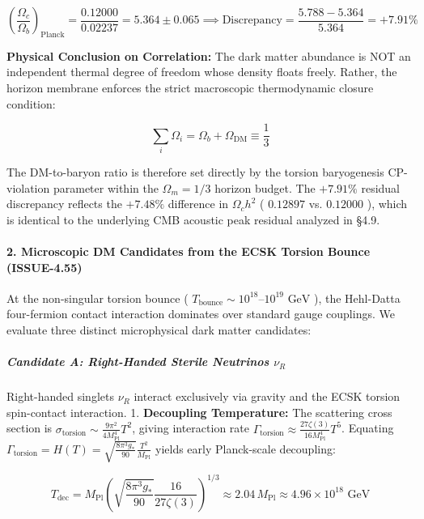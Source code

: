 \documentclass[11pt,a4paper]{article}
\theoremstyle{definition}\newtheorem{definition}{Definition}
\theoremstyle{remark}\newtheorem{remark}{Remark}
\begin{document}
\begin{equation}
\left(\frac{\Omega_c}{\Omega_b}\right)_{\text{Planck}} = \frac{0.12000}{0.02237} = 5.364 \pm 0.065 \implies \text{Discrepancy} = \frac{5.788 - 5.364}{5.364} = \mathbf{+7.91\%}
\end{equation}


\textbf{Physical Conclusion on Correlation:} The dark matter abundance is NOT an independent thermal degree of freedom whose density floats freely. Rather, the horizon membrane enforces the strict macroscopic thermodynamic closure condition:


\begin{equation}
\sum_i \Omega_i = \Omega_b + \Omega_{\text{DM}} \equiv \frac{1}{3}
\end{equation}


The DM-to-baryon ratio is therefore set directly by the torsion baryogenesis CP-violation parameter within the $\Omega_m = 1/3$ horizon budget. The $+7.91\%$ residual discrepancy reflects the $+7.48\%$ difference in $\Omega_c h^2$ ( $0.12897$ vs. $0.12000$ ), which is identical to the underlying CMB acoustic peak residual analyzed in §4.9.
\paragraph{2. Microscopic DM Candidates from the ECSK Torsion Bounce (ISSUE-4.55)}

At the non-singular torsion bounce ( $T_{\text{bounce}} \sim 10^{18}\text{--}10^{19}\text{ GeV}$ ), the Hehl-Datta four-fermion contact interaction dominates over standard gauge couplings. We evaluate three distinct microphysical dark matter candidates:
\subparagraph{Candidate A: Right-Handed Sterile Neutrinos $\nu_R$}

Right-handed singlets $\nu_R$ interact exclusively via gravity and the ECSK torsion spin-contact interaction.
1. \textbf{Decoupling Temperature:} The scattering cross section is $\sigma_{\text{torsion}} \sim \frac{9\pi^2}{4 M_{\text{Pl}}^4} T^2$, giving interaction rate $\Gamma_{\text{torsion}} \approx \frac{27\zeta(3)}{16 M_{\text{Pl}}^4} T^5$. Equating $\Gamma_{\text{torsion}} = H(T) = \sqrt{\frac{8\pi^3 g_*}{90}}\frac{T^2}{M_{\text{Pl}}}$ yields early Planck-scale decoupling:


\begin{equation}
T_{\text{dec}} = M_{\text{Pl}} \left( \sqrt{\frac{8\pi^3 g_*}{90}} \frac{16}{27\zeta(3)} \right)^{1/3} \approx 2.04 \, M_{\text{Pl}} \approx 4.96 \times 10^{18}\text{ GeV}
\end{equation}
\end{document}
